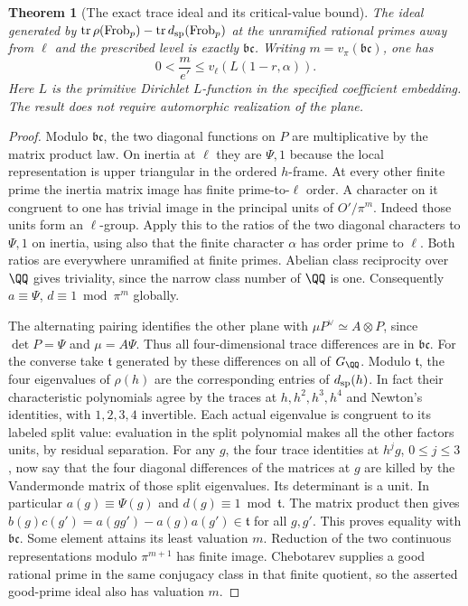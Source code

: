 \documentclass[a4paper,11pt]{article}
\newtheorem{theorem}[proposition]{Theorem}
\theoremstyle{definition}
\theoremstyle{remark}
\numberwithin{equation}{section}
\begin{document}
\begin{theorem}[The exact trace ideal and its critical-value bound]
\leavevmode\label{thm:planedepth566}
The ideal generated by
\(\operatorname{tr}\rho(\operatorname{Frob}_p)-
\operatorname{tr}d_{\rm sp}(\operatorname{Frob}_p)\)
at the unramified rational primes away from \(\ell\) and the
prescribed level is exactly \(\mathfrak b\mathfrak c\).
Writing \(m=v_\pi(\mathfrak b\mathfrak c)\), one has
\[
                  0<\frac{m}{e'}\le v_\ell(L(1-r,\alpha)).
\]
Here \(L\) is the primitive Dirichlet \(L\)-function in the
specified coefficient embedding. The result does not require
automorphic realization of the plane.
\end{theorem}
\begin{proof}
Modulo \(\mathfrak b\mathfrak c\), the two diagonal functions
on \(P\) are multiplicative by the matrix product law. On
inertia at \(\ell\) they are \(\Psi,1\) because the local
representation is upper triangular in the ordered \(h\)-frame.
At every other finite prime the inertia matrix image has finite
prime-to-\(\ell\) order. A character on it congruent to one has
trivial image in the principal units of \(O'/\pi^m\).
Indeed those units form an \(\ell\)-group. Apply this to the
ratios of the two diagonal characters to \(\Psi,1\) on inertia,
using also that the finite character \(\alpha\) has order
prime to \(\ell\). Both ratios are everywhere unramified at
finite primes. Abelian class reciprocity over \(\QQ\) gives
triviality, since the narrow class number of \(\QQ\) is one.
Consequently \(a\equiv\Psi\), \(d\equiv1\bmod\pi^m\) globally.

The alternating pairing identifies the other plane with
\(\mu P^\vee\simeq A\otimes P\), since \(\det P=\Psi\)
and \(\mu=A\Psi\). Thus all four-dimensional trace differences
are in \(\mathfrak b\mathfrak c\). For the converse take
\(\mathfrak t\) generated by these differences on all of
\(G_\QQ\). Modulo \(\mathfrak t\), the four eigenvalues of
\(\rho(h)\) are the corresponding entries of \(d_{\rm sp}(h)\).
In fact their characteristic polynomials agree by the traces at
\(h,h^2,h^3,h^4\) and Newton's identities, with \(1,2,3,4\)
invertible. Each actual eigenvalue is congruent to its labeled
split value: evaluation in the split polynomial makes all the
other factors units, by residual separation. For any \(g\), the
four trace identities at \(h^j g\), \(0\le j\le3\), now say that
the four diagonal differences of the matrices at \(g\) are killed
by the Vandermonde matrix of those split eigenvalues. Its
determinant is a unit. In particular \(a(g)\equiv\Psi(g)\)
and \(d(g)\equiv1\bmod\mathfrak t\). The matrix product then
gives \(b(g)c(g')=a(gg')-a(g)a(g')\in\mathfrak t\) for all
\(g,g'\). This proves equality with \(\mathfrak b\mathfrak c\).
Some element attains its least valuation \(m\). Reduction of
the two continuous representations modulo \(\pi^{m+1}\) has
finite image. Chebotarev supplies a good rational prime in the
same conjugacy class in that finite quotient, so the asserted
good-prime ideal also has valuation \(m\).


\end{proof}
\end{document}
